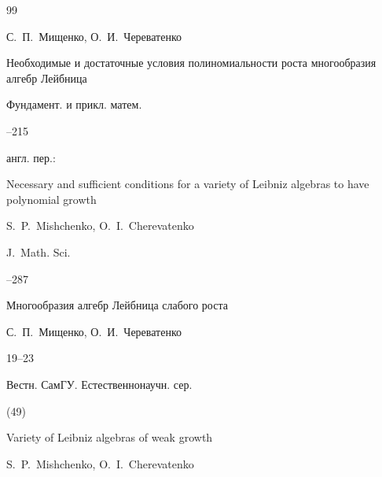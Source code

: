 \begin{thebibliography}{99}

\by С.~П.~Мищенко, О.~И.~Череватенко

\paper Необходимые и достаточные условия полиномиальности роста многообразия алгебр Лейбница

\jour Фундамент. и прикл. матем.




--215





\transl англ. пер.:~

\paper Necessary and sufficient conditions for a variety of Leibniz algebras to have polynomial growth

\by S.~P.~Mishchenko, O.~I.~Cherevatenko 

\jour J.~Math. Sci.




--287






\paper Многообразия алгебр Лейбница слабого роста

\by С.~П.~Мищенко, О.~И.~Череватенко


\pages \mbox{19--23}

\jour Вестн. СамГУ. Естественнонаучн. сер.


(49)


\misctransl

\paper Variety of Leibniz algebras of weak growth 

\by S.~P.~Mishchenko, O.~I.~Cherevatenko



\end{thebibliography}
